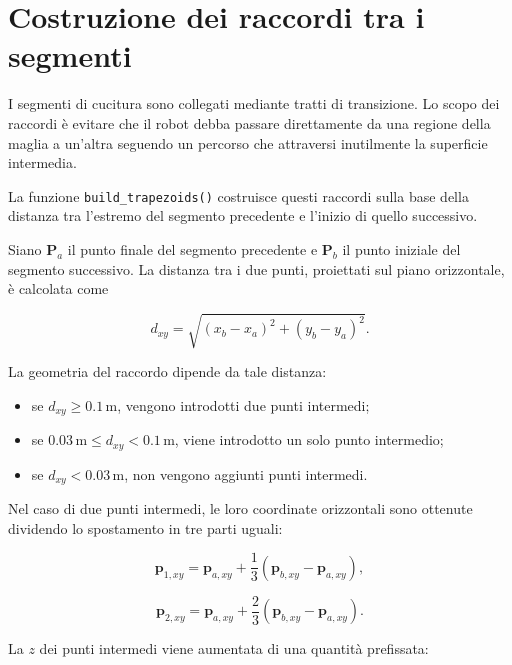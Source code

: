 \section{Costruzione dei raccordi tra i segmenti}

I segmenti di cucitura sono collegati mediante tratti di transizione. Lo scopo dei raccordi è evitare che il robot debba passare direttamente da una regione della maglia a un'altra seguendo un percorso che attraversi inutilmente la superficie intermedia.

La funzione \texttt{build\_trapezoids()} costruisce questi raccordi sulla base della distanza tra l'estremo del segmento precedente e l'inizio di quello successivo.

Siano $\mathbf{P}_a$ il punto finale del segmento precedente e $\mathbf{P}_b$ il punto iniziale del segmento successivo. La distanza tra i due punti, proiettati sul piano orizzontale, è calcolata come

\begin{equation}
    d_{xy}
    = \sqrt{(x_b-x_a)^2+(y_b-y_a)^2}.
    \label{eq:distanza_xy}
\end{equation}

La geometria del raccordo dipende da tale distanza:

\begin{itemize}
    \item se $d_{xy} \geq 0.1\,\mathrm{m}$, vengono introdotti due punti intermedi;
    \item se $0.03\,\mathrm{m} \leq d_{xy} < 0.1\,\mathrm{m}$, viene introdotto un solo punto intermedio;
    \item se $d_{xy} < 0.03\,\mathrm{m}$, non vengono aggiunti punti intermedi.
\end{itemize}

Nel caso di due punti intermedi, le loro coordinate orizzontali sono ottenute dividendo lo spostamento in tre parti uguali:

\begin{equation}
    \mathbf{p}_{1,xy}
    = \mathbf{p}_{a,xy}
    + \frac{1}{3}
    \left(\mathbf{p}_{b,xy}-\mathbf{p}_{a,xy}\right),
\end{equation}

\begin{equation}
    \mathbf{p}_{2,xy}
    = \mathbf{p}_{a,xy}
    + \frac{2}{3}
    \left(\mathbf{p}_{b,xy}-\mathbf{p}_{a,xy}\right).
\end{equation}

La $z$ dei punti intermedi viene aumentata di una quantità prefissata:

